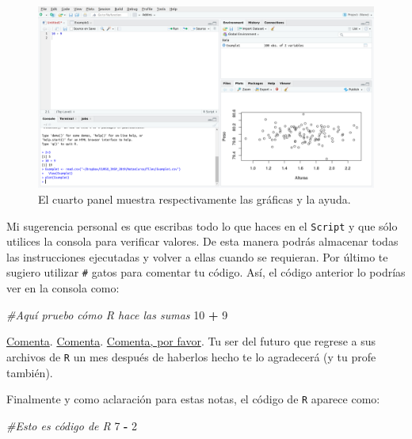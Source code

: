 \documentclass[
]{book}
\newenvironment{Shaded}{\begin{snugshade}}{\end{snugshade}}
\newcommand{\CommentTok}[1]{\textcolor[rgb]{0.56,0.35,0.01}{\textit{#1}}}
\newcommand{\DecValTok}[1]{\textcolor[rgb]{0.00,0.00,0.81}{#1}}
\newcommand{\OperatorTok}[1]{\textcolor[rgb]{0.81,0.36,0.00}{\textbf{#1}}}
\newcommand{\StringTok}[1]{\textcolor[rgb]{0.31,0.60,0.02}{#1}}
\begin{document}
\begin{figure}

{\centering \includegraphics[width=40in]{images/RStudio7} 

}

\caption{El cuarto panel muestra respectivamente las gráficas y la ayuda.}\label{fig:unnamed-chunk-16}
\end{figure}

Mi sugerencia personal es que escribas todo lo que haces en el \texttt{Script} y que sólo utilices la consola para verificar valores. De esta manera podrás almacenar todas las instrucciones ejecutadas y volver a ellas cuando se requieran. Por último te sugiero utilizar \texttt{\#} gatos para comentar tu código. Así, el código anterior lo podrías ver en la consola como:

\begin{Shaded}
\begin{Highlighting}[]
\CommentTok{#Aquí pruebo cómo R hace las sumas}
\DecValTok{10} \OperatorTok{+}\StringTok{ }\DecValTok{9}
\end{Highlighting}
\end{Shaded}

\href{https://www.freecodecamp.org/news/code-comments-the-good-the-bad-and-the-ugly-be9cc65fbf83/}{Comenta}. \href{https://www.c-sharpcorner.com/blogs/why-comments-are-important-while-writing-a-code}{Comenta}. \href{https://blog.codinghorror.com/code-tells-you-how-comments-tell-you-why/}{Comenta, por favor}. Tu ser del futuro que regrese a sus archivos de \texttt{R} un mes después de haberlos hecho te lo agradecerá (y tu profe también).

Finalmente y como aclaración para estas notas, el código de \texttt{R} aparece como:

\begin{Shaded}
\begin{Highlighting}[]
\CommentTok{#Esto es código de R}
\DecValTok{7} \OperatorTok{-}\StringTok{ }\DecValTok{2}
\end{Highlighting}
\end{Shaded}
\end{document}
